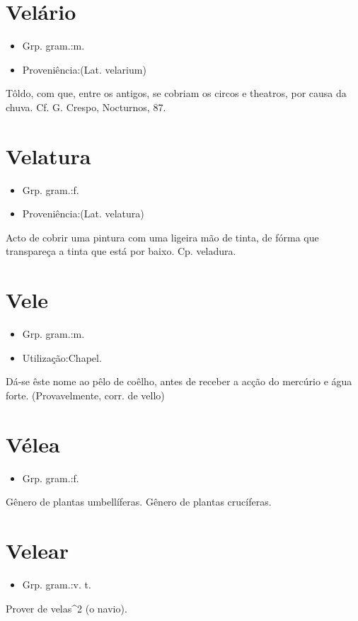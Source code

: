 \documentclass{article}
\begin{document}
\section{Velário}
\begin{itemize}
\item {Grp. gram.:m.}
\end{itemize}
\begin{itemize}
\item {Proveniência:(Lat. \textunderscore velarium\textunderscore )}
\end{itemize}
Tôldo, com que, entre os antigos, se cobriam os circos e theatros, por causa da chuva. Cf. G. Crespo, \textunderscore Nocturnos\textunderscore , 87.
\section{Velatura}
\begin{itemize}
\item {Grp. gram.:f.}
\end{itemize}
\begin{itemize}
\item {Proveniência:(Lat. \textunderscore velatura\textunderscore )}
\end{itemize}
Acto de cobrir uma pintura com uma ligeira mão de tinta, de fórma que transpareça a tinta que está por baixo. Cp. \textunderscore veladura\textunderscore .
\section{Vele}
\begin{itemize}
\item {Grp. gram.:m.}
\end{itemize}
\begin{itemize}
\item {Utilização:Chapel.}
\end{itemize}
Dá-se êste nome ao pêlo de coêlho, antes de receber a acção do mercúrio e água forte.
(Provavelmente, corr. de \textunderscore vello\textunderscore )
\section{Vélea}
\begin{itemize}
\item {Grp. gram.:f.}
\end{itemize}
Gênero de plantas umbellíferas.
Gênero de plantas crucíferas.
\section{Velear}
\begin{itemize}
\item {Grp. gram.:v. t.}
\end{itemize}
Prover de velas^2 (o navio).
\end{document}
